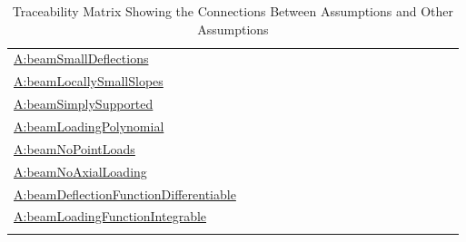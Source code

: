 \documentclass[12pt]{article}
\begin{document}
\begin{longtable}{l l l l l l l l l l l l l l l l l l}
\\
\hyperref[beamSmallDeflections]{A:beamSmallDeflections} &  &  &  &  &  &  &  &  &  &  &  &  &  &  &  &  & 
\\
\hyperref[beamLocallySmallSlopes]{A:beamLocallySmallSlopes} &  &  &  &  &  &  &  &  &  &  &  &  &  &  &  &  & 
\\
\hyperref[beamSimplySupported]{A:beamSimplySupported} &  &  &  &  &  &  &  &  &  &  &  &  &  &  &  &  & 
\\
\hyperref[beamLoadingPolynomial]{A:beamLoadingPolynomial} &  &  &  &  &  &  &  &  &  &  &  &  &  &  &  &  & 
\\
\hyperref[beamNoPointLoads]{A:beamNoPointLoads} &  &  &  &  &  &  &  &  &  &  &  &  &  &  &  &  & 
\\
\hyperref[beamNoAxialLoading]{A:beamNoAxialLoading} &  &  &  &  &  &  &  &  &  &  &  &  &  &  &  &  & 
\\
\hyperref[beamDeflectionFunctionDifferentiable]{A:beamDeflectionFunctionDifferentiable} &  &  &  &  &  &  &  &  &  &  &  &  &  &  &  &  & 
\\
\hyperref[beamLoadingFunctionIntegrable]{A:beamLoadingFunctionIntegrable} &  &  &  &  &  &  &  &  &  &  &  &  &  &  &  &  & 
\\
\bottomrule
\caption{Traceability Matrix Showing the Connections Between Assumptions and Other Assumptions}
\label{Table:TraceMatAvsA}
\end{longtable}
\end{document}

